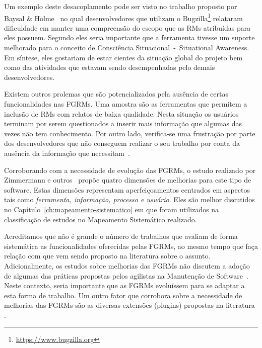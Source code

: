 
Um exemplo deste desacoplamento pode ser visto no trabalho proposto por Baysal
\& Holme~\cite{baysal2012qualitative} no qual desenvolvedores que utilizam o
Bugzilla\footnote{\url{https://www.bugzilla.org}} relataram dificuldade em
manter uma compreensão do escopo que as RMs atribuídas para eles possuem.
Segundo eles seria importante que a ferramenta tivesse um suporte melhorado para
o conceito de Consciência Situacional~-~Situational Awareness. Em síntese, eles
gostariam de estar cientes da situação global do projeto bem como das atividades
que estavam sendo desempenhadas pelo demais desenvolvedores.

Existem outros prolemas que são potencializados pela ausência de certas
funcionalidades nas FGRMs. Uma amostra são as ferramentas que permitem a
inclusão de RMs com relatos de baixa qualidade. Nesta situação os usuários
terminam por serem questionados a inserir mais informação que algumas das vezes
não tem conhecimento. Por outro lado, verifica-se uma frustração por parte dos
desenvolvedores que não conseguem realizar o seu trabalho por conta da ausência
da informação que necessitam~\cite{just2008towards}.

Corroborando com a necessidade de evolução das FGRMs, o estudo realizado por
Zimmermann e outros~\cite{zimmermann2009improving} propõe quatro dimensões de
melhorias para este tipo de software. Estas dimensões representam
aperfeiçoamentos centrados em aspectos tais como \textit{ferramenta, informação,
    processo e usuário}. Eles são melhor discutidos no
Capítulo~\ref{ch:mapeamento-sistematico} em que foram utilizados na
classificação de estudos no Mapeamento Sistemático realizado.


Acreditamos que não é grande o número de trabalhos que avaliam de forma
sistemática as funcionalidades oferecidas pelas FGRMs, ao mesmo tempo que faça
relação com que vem sendo proposto na li\-te\-ra\-tu\-ra sobre o assunto.
Adicionalmente, os estudos sobre melhorias das FGRMs não discutem a adoção de
algumas das práticas propostas pelos agilistas na Manutenção de
Software~\cite{Soltan2016,Devulapally2015, Heeager2015}. Neste contexto, seria
importante que as FGRMs evoluíssem para se adaptar a esta forma de trabalho. Um
outro fator que corrobora sobre a necessidade de melhorias das FGRMs são as
diversas extensões (plugins) propostas na literatura
\cite{101186,Thung:2014:BIT:2635868.2661678,Kononenko:2014:DED:2591062.2591075}.

